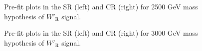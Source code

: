 \begin{figure}[H]
  \centering
  \caption{Pre-fit plots in the SR (left) and CR (right) for 2500 GeV mass hypothesis of $W'_{\text{R}}$ signal.}
  \label{fig:Prefit_WpRH2500_Asimov}
\end{figure}
\begin{figure}[H]
  \centering
  \caption{Pre-fit plots in the SR (left) and CR (right) for 3000 GeV mass hypothesis of $W'_{\text{R}}$ signal.}
  \label{fig:Prefit_WpRH3000_Asimov}
\end{figure}
